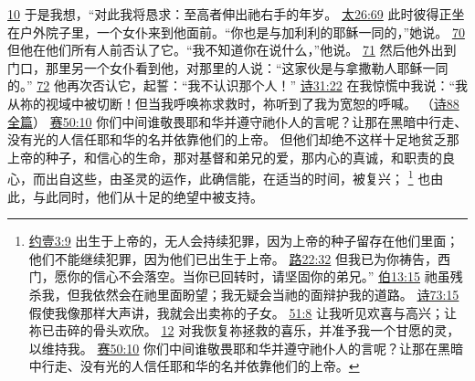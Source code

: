 \documentclass[12pt, a4paper, oneside]{ctexart}
\begin{document}
{		\href{https://biblehub.com/psalms/77-10.htm}{10} 于是我想，“对此我将恳求：至高者伸出祂右手的年岁。
		\href{https://biblehub.com/matthew/26-69.htm}{太26:69} 此时彼得正坐在户外院子里，一个女仆来到他面前。“你也是与加利利的耶稣一同的，”她说。
		\href{https://biblehub.com/matthew/26-70.htm}{70} 但他在他们所有人前否认了它。“我不知道你在说什么，”他说。
		\href{https://biblehub.com/matthew/26-71.htm}{71} 然后他外出到门口，那里另一个女仆看到他，对那里的人说：“这家伙是与拿撒勒人耶稣一同的。”
		\href{https://biblehub.com/matthew/26-72.htm}{72} 他再次否认它，起誓：“我不认识那个人！”
		\href{https://biblehub.com/psalms/31-22.htm}{诗31:22} 在我惊慌中我说：“我从祢的视域中被切断！但当我呼唤祢求救时，祢听到了我为宽恕的呼喊。
		（\href{https://biblehub.com/niv/psalms/88.htm}{诗88全篇}）
		\href{https://biblehub.com/isaiah/50-10.htm}{赛50:10} 你们中间谁敬畏耶和华并遵守祂仆人的言呢？让那在黑暗中行走、没有光的人信任耶和华的名并依靠他们的上帝。
	}
	但他们却绝不这样十足地贫乏那上帝的种子，和信心的生命，那对基督和弟兄的爱，那内心的真诚，和职责的良心，而出自这些，由圣灵的运作，此确信能，在适当的时间，被复兴；
	\footnote {
		\href{https://biblehub.com/1_john/3-9.htm}{约壹3:9} 出生于上帝的，无人会持续犯罪，因为上帝的种子留存在他们里面；他们不能继续犯罪，因为他们已出生于上帝。
		\href{https://biblehub.com/luke/22-32.htm}{路22:32} 但我已为你祷告，西门，愿你的信心不会落空。当你已回转时，请坚固你的弟兄。”
		\href{https://biblehub.com/job/13-15.htm}{伯13:15} 祂虽残杀我，但我依然会在祂里面盼望；我无疑会当祂的面辩护我的道路。
		\href{https://biblehub.com/psalms/73-15.htm}{诗73:15} 假使我像那样大声讲，我就会出卖祢的子女。
		\href{https://biblehub.com/psalms/51-8.htm}{51:8} 让我听见欢喜与高兴；让祢已击碎的骨头欢欣。
		\href{https://biblehub.com/psalms/51-12.htm}{12} 对我恢复祢拯救的喜乐，并准予我一个甘愿的灵，以维持我。
        \href{https://biblehub.com/isaiah/50-10.htm}{赛50:10} 你们中间谁敬畏耶和华并遵守祂仆人的言呢？让那在黑暗中行走、没有光的人信任耶和华的名并依靠他们的上帝。
	}
	也由此，与此同时，他们从十足的绝望中被支持。
\end{document}
